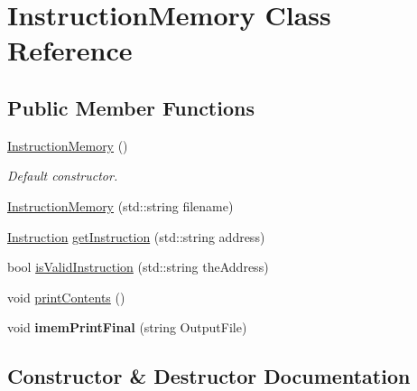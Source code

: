 \hypertarget{class_instruction_memory}{}\section{Instruction\+Memory Class Reference}
\label{class_instruction_memory}
\subsection*{Public Member Functions}
\begin{DoxyCompactItemize}
\item 
\mbox{\label{class_instruction_memory_ab8cf52c9d90ee839882175f1f0d092da}} 
\mbox{\hyperlink{class_instruction_memory_ab8cf52c9d90ee839882175f1f0d092da}{Instruction\+Memory}} ()
\begin{DoxyCompactList}\small\item\em Default constructor. \end{DoxyCompactList}\item 
\mbox{\hyperlink{class_instruction_memory_a9e98dfb1c96db56d02cbd1a7aed31ec7}{Instruction\+Memory}} (std\+::string filename)
\item 
\mbox{\hyperlink{class_instruction}{Instruction}} \mbox{\hyperlink{class_instruction_memory_a9991daa81af7611a8ff76bbbd4b64630}{get\+Instruction}} (std\+::string address)
\item 
bool \mbox{\hyperlink{class_instruction_memory_a530d8236c9ddb2827d13a17bb5a6cdd6}{is\+Valid\+Instruction}} (std\+::string the\+Address)
\item 
void \mbox{\hyperlink{class_instruction_memory_a56a478d5ce8327bf58c9d726898921f8}{print\+Contents}} ()
\item 
\mbox{\label{class_instruction_memory_a3918544f9b0e0f62169b297ef4c73b3a}} 
void {\bfseries imem\+Print\+Final} (string Output\+File)
\end{DoxyCompactItemize}


\subsection{Constructor \& Destructor Documentation}
\mbox{\label{class_instruction_memory_a9e98dfb1c96db56d02cbd1a7aed31ec7}} 
